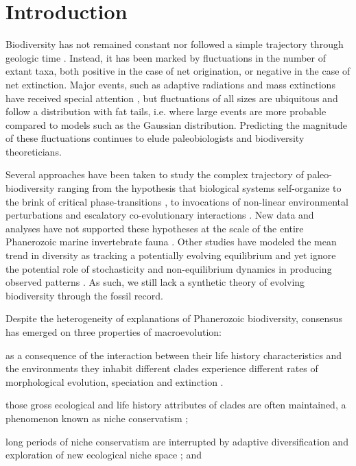 \documentclass[12pt]{article}
\let\citep=\cite
\begin{document}
\section*{Introduction}

Biodiversity has not remained constant nor followed a simple
trajectory through geologic time \citep{raup1982, sepkoski1984,
  gilinsky1994, liow2007, alroy08, alroy2010}.  Instead, it has been
marked by fluctuations in the number of extant taxa, both positive in
the case of net origination, or negative in the case of net
extinction. Major events, such as adaptive radiations and mass
extinctions have received special attention \citep{benton1995,
  Erwin1998}, but fluctuations of all sizes are ubiquitous
\citep{sepkoski1984, alroy08, quental2013} and follow a distribution
with fat tails, i.e. where large events are more probable compared to
models such as the Gaussian distribution. Predicting the magnitude
of these fluctuations continues to elude paleobiologists and
biodiversity theoreticians.

Several approaches have been taken to study the complex trajectory of
paleo-biodiversity ranging from the hypothesis that biological systems
self-organize to the brink of critical phase-transitions
\citep{bak1993, sole1997}, to invocations of non-linear environmental
perturbations \citep{newman1995} and escalatory co-evolutionary
interactions \citep{vermeij1987}. New data and analyses have not
supported these hypotheses at the scale of the entire
Phanerozoic marine invertebrate fauna \citep{kirchner1998, madin2006,
  alroy08}. Other studies have modeled the mean trend in diversity as
tracking a potentially evolving equilibrium \citep{sepkoski1984,
  alroy08, alroy2010, rabosky2009ecolLett} and yet ignore the
potential role of stochasticity and non-equilibrium dynamics in
producing observed patterns \citep{erwin2012, liow2007,
  quental2013}. As such, we still lack a synthetic theory of evolving
biodiversity through the fossil record.

Despite the heterogeneity of explanations of Phanerozoic
biodiversity, consensus has emerged on three properties of
macroevolution:
\begin{inparaenum}
\item as a consequence of the interaction between their life history
  characteristics and the environments they inhabit \citep{vrba1983}
  different clades experience different rates of morphological
  evolution, speciation and extinction \citep{simpson1953,
    sepkoski1984, holman1989, gilinsky1994}.
\item those gross ecological and life history attributes of clades
  are often maintained, a phenomenon known as niche conservatism
  \citep{roy2009range, hopkins2014};
\item long periods of niche conservatism are interrupted by adaptive
  diversification and exploration of new ecological niche space
  \citep{eldredgeGould1972, newman1985adaptive, hopkins2014}; and
\end{inparaenum}
\end{document}
